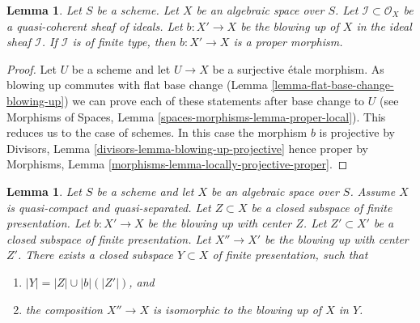 \documentclass{stacks-project}
\theoremstyle{plain}
\newtheorem{lemma}[subsection]{Lemma}
\theoremstyle{definition}
\theoremstyle{remark}
\numberwithin{equation}{subsection}
\begin{document}
\begin{lemma}
\label{lemma-blowing-up-projective}
Let $S$ be a scheme. Let $X$ be an algebraic space over $S$.
Let $\mathcal{I} \subset \mathcal{O}_X$ be a quasi-coherent
sheaf of ideals. Let $b : X' \to X$ be the blowing up of $X$
in the ideal sheaf $\mathcal{I}$. If $\mathcal{I}$ is of finite type, then
$b : X' \to X$ is a proper morphism.
\end{lemma}

\begin{proof}
Let $U$ be a scheme and let $U \to X$ be a surjective \'etale morphism.
As blowing up commutes with flat base change
(Lemma \ref{lemma-flat-base-change-blowing-up})
we can prove each of these statements after base change to $U$
(see Morphisms of Spaces, Lemma
\ref{spaces-morphisms-lemma-proper-local}).
This reduces us to the case of schemes.
In this case the morphism $b$ is projective by
Divisors, Lemma \ref{divisors-lemma-blowing-up-projective}
hence proper by
Morphisms, Lemma \ref{morphisms-lemma-locally-projective-proper}.
\end{proof}

\begin{lemma}
\label{lemma-composition-finite-type-blowups}
Let $S$ be a scheme and let $X$ be an algebraic space over $S$.
Assume $X$ is quasi-compact and quasi-separated.
Let $Z \subset X$ be a closed subspace of finite presentation.
Let $b : X' \to X$ be the blowing up with center $Z$.
Let $Z' \subset X'$ be a closed subspace of finite presentation.
Let $X'' \to X'$ be the blowing up with center $Z'$.
There exists a closed subspace $Y \subset X$ of finite presentation,
such that
\begin{enumerate}
\item $|Y| = |Z| \cup |b|(|Z'|)$, and
\item the composition $X'' \to X$ is isomorphic to the blowing up
of $X$ in $Y$.
\end{enumerate}
\end{lemma}
\end{document}
